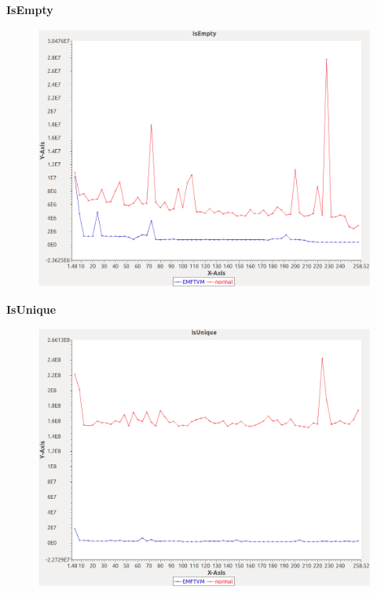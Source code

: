 \noindent\textbf{IsEmpty}

\begin{figure}[h]
\centering
\includegraphics[width=\textwidth]{../graphs/orderedset/IsEmpty}
\end{figure}
\pagebreak

\noindent\textbf{IsUnique}

\begin{figure}[h]
\centering
\includegraphics[width=\textwidth]{../graphs/orderedset/isUnique}
\end{figure}
\pagebreak

